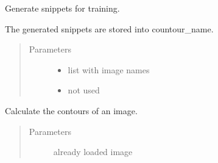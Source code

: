 \documentclass[letterpaper,10pt,english]{sphinxmanual}
\begin{document}

\begin{fulllineitems}
\label{\detokenize{api:find_logos.generate_train_snippets_and_store_them}}
Generate snippets for training.

The generated snippets are stored into countour\_name.
\begin{quote}\begin{description}
\item[{Parameters}] \leavevmode\begin{itemize}
\item {} 
 \textendash{} list with image names

\item {} 
 \textendash{} not used

\end{itemize}

\end{description}\end{quote}

\end{fulllineitems}


\begin{fulllineitems}
\label{\detokenize{api:find_logos.get_shapes}}
Calculate the contours of an image.
\begin{quote}\begin{description}
\item[{Parameters}] \leavevmode
{} \textendash{} already loaded image

\end{description}\end{quote}

\end{fulllineitems}

\end{document}
